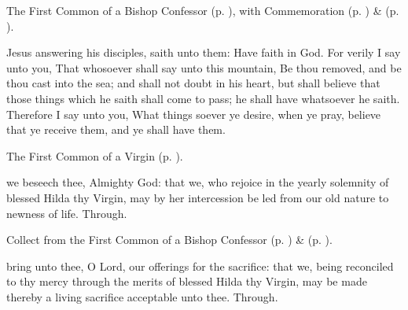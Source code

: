 
\begin{rubric}
	The First Common of a Bishop Confessor (p. \pageref{CommonConfessorBishopI}), with Commemoration  (p. \pageref{HildaWhitby}) \&  (p. \pageref{SPSaints}).
\end{rubric}

 Jesus answering his disciples, saith unto them: Have faith in God. For verily I say unto you, That whosoever shall say unto this mountain, Be thou removed, and be thou cast into the sea; and shall not doubt in his heart, but shall believe that those things which he saith shall come to pass; he shall have whatsoever he saith. Therefore I say unto you, What things soever ye desire, when ye pray, believe that ye receive them, and ye shall have them.


\label{HildaWhitby}

\begin{rubric}
	The First Common of a Virgin (p. \pageref{CommonVirginOnlyI}).
\end{rubric}

\collect
{} we beseech thee, Almighty God: that we, who rejoice in the yearly solemnity of blessed Hilda thy Virgin, may by her intercession be led from our old nature to newness of life. Through.

\begin{rubric}
	 Collect  from the First Common of a Bishop Confessor (p. \pageref{CommonConfessorBishopICollect}) \&   (p. \pageref{SPSaints}).
\end{rubric}


\secret
{} bring unto thee, O Lord, our offerings for the sacrifice: that we, being reconciled to thy mercy through the merits of blessed Hilda thy Virgin, may be made thereby a living sacrifice acceptable unto thee. Through.


